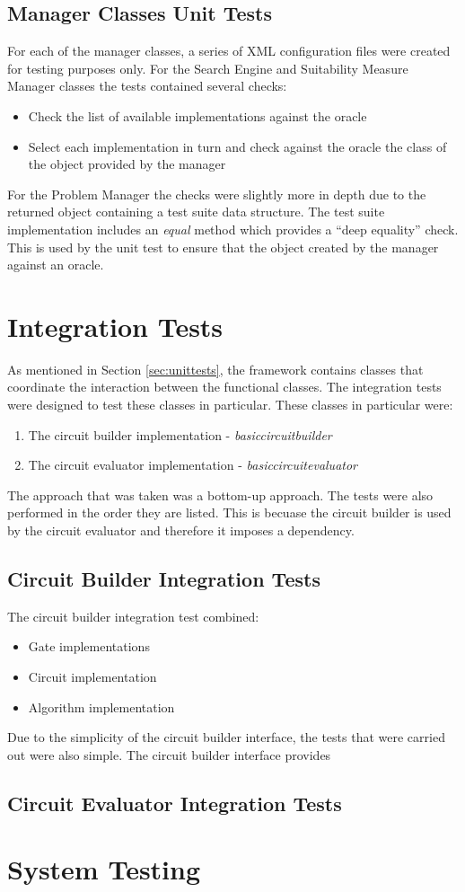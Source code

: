 \subsection{Manager Classes Unit Tests}
For each of the manager classes, a series of XML configuration files were created for testing purposes only.
For the Search Engine and Suitability Measure Manager classes the tests contained several checks:
\begin{itemize}
 \item Check the list of available implementations against the oracle
 \item Select each implementation in turn and check against the oracle the class of the object provided by the manager
\end{itemize}

For the Problem Manager the checks were slightly more in depth due to the returned object containing a test suite data structure.
The test suite implementation includes an \emph{equal} method which provides a ``deep equality'' check.
This is used by the unit test to ensure that the object created by the manager against an oracle.

\section{Integration Tests}
As mentioned in Section \ref{sec:unittests}, the framework contains classes that coordinate the interaction between the functional classes.
The integration tests were designed to test these classes in particular.
These classes in particular were:
\begin{enumerate}
 \item The circuit builder implementation - \emph{basiccircuitbuilder}
 \item The circuit evaluator implementation - \emph{basiccircuitevaluator}
\end{enumerate}

The approach that was taken was a bottom-up approach.
The tests were also performed in the order they are listed.
This is becuase the circuit builder is used by the circuit evaluator and therefore it imposes a dependency.

\subsection{Circuit Builder Integration Tests}
The circuit builder integration test combined:
\begin{itemize}
 \item Gate implementations
 \item Circuit implementation
 \item Algorithm implementation
\end{itemize}

Due to the simplicity of the circuit builder interface, the tests that were carried out were also simple.
The circuit builder interface provides 


\subsection{Circuit Evaluator Integration Tests}

\section{System Testing}

